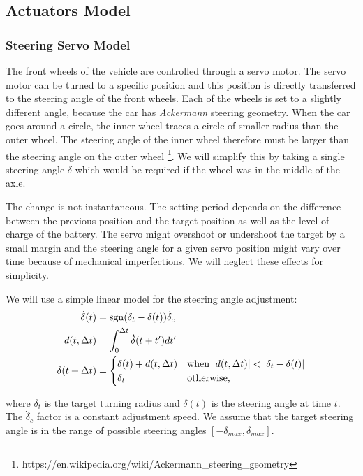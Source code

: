 \subsection{Actuators Model}

\subsubsection{Steering Servo Model}

The front wheels of the vehicle are controlled through a servo motor. The servo motor can be turned to a specific position and this position is directly transferred to the steering angle of the front wheels. Each of the wheels is set to a slightly different angle, because the car has \textit{Ackermann} steering geometry. When the car goes around a circle, the inner wheel traces a circle of smaller radius than the outer wheel. The steering angle of the inner wheel therefore must be larger than the steering angle on the outer wheel \footnote{https://en.wikipedia.org/wiki/Ackermann\_steering\_geometry}. We will simplify this by taking a single steering angle $\delta$ which would be required if the wheel was in the middle of the axle.

The change is not instantaneous. The setting period depends on the difference between the previous position and the target position as well as the level of charge of the battery. The servo might overshoot or undershoot the target by a small margin and the steering angle for a given servo position might vary over time because of mechanical imperfections. We will neglect these effects for simplicity.

We will use a simple linear model for the steering angle adjustment:
\begin{equation}
\begin{aligned}
	\dot{\delta}(t) &= \operatorname{sgn}(\delta_t-\delta(t)) \dot{\delta}_{c} \\
	d(t, \Delta t)&=\int_{0}^{\Delta t} \dot{\delta}(t + t') dt' \\
	\delta(t+\Delta t) &= \begin{cases}
		\delta(t) + d(t, \Delta t) & \text{when }|d(t, \Delta t)| < |\delta_t - \delta(t)| \\
		\delta_t & \text{otherwise,}
	\end{cases}		
\end{aligned}
\end{equation}

where $\delta_t$ is the target turning radius and $\delta(t)$ is the steering angle at time $t$. The $\dot{\delta}_{c}$ factor is a constant adjustment speed. We assume that the target steering angle is in the range of possible steering angles $\left[-\delta_{max},\delta_{max}\right]$.

